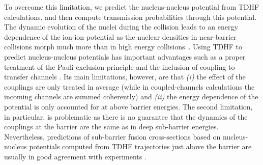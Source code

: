 To overcome this limitation, we predict the nucleus-nucleus potential from TDHF calculations, and then compute transmission probabilities through this potential. 
The dynamic evolution of the nuclei during the collision leads to an energy dependence of the ion-ion potential as the nuclear densities 
in near-barrier collisions morph much more than in high energy collisions~\protect\cite{washiyama2008,umar2014a,jiang2014}. 
Using TDHF to predict nucleus-nucleus potentials has important advantages such as a proper treatment of the Pauli exclusion principle \protect\cite{simenel2017} 
and the inclusion of coupling to transfer channels \protect\cite{godbey2017}.
Its main limitations, however, are that {\it (i)} the effect of the couplings are only treated in average 
(while in coupled-channels calculations the incoming channels are summed coherently) and 
{\it (ii)} the energy dependence of the potential is only accounted for at above barrier energies.
The second limitation, in particular, is problematic as there is no guarantee that the dynamics of the couplings at the barrier are the same as in deep sub-barrier energies. 
Nevertheless, predictions of sub-barrier fusion cross-sections based on nucleus-nucleus potentials computed from TDHF trajectories just above the barrier 
are usually in good agreement with experiments \protect\cite{umar2012a,umar2009b,keser2012,simenel2013a}.



